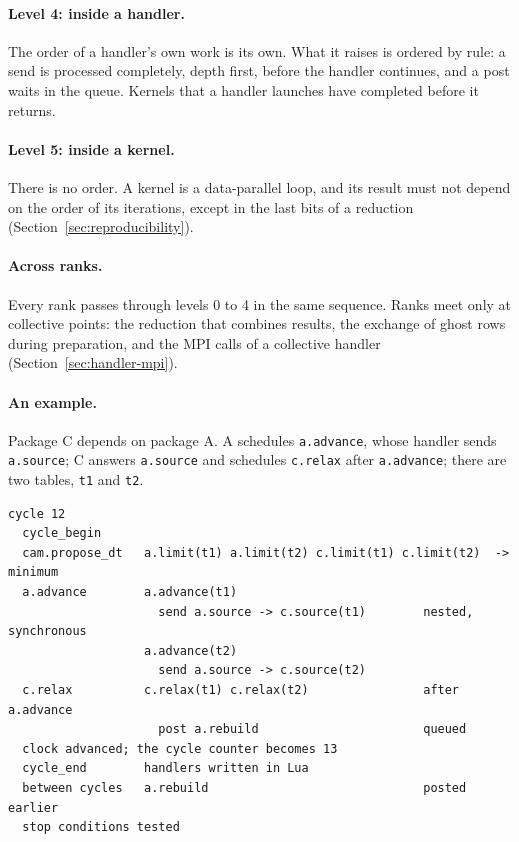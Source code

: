 \documentclass[11pt,a4paper]{article}
\newcommand{\code}[1]{\texttt{#1}}
\begin{document}
\paragraph{Level 4: inside a handler.}  The order of a handler's own work is
its own.  What it raises is ordered by rule: a send is processed completely,
depth first, before the handler continues, and a post waits in the queue.
Kernels that a handler launches have completed before it returns.

\paragraph{Level 5: inside a kernel.}  There is no order.  A kernel is a
data-parallel loop, and its result must not depend on the order of its
iterations, except in the last bits of a reduction
(Section~\ref{sec:reproducibility}).

\paragraph{Across ranks.}  Every rank passes through levels 0 to 4 in the
same sequence.  Ranks meet only at collective points: the reduction that
combines results, the exchange of ghost rows during preparation, and the
MPI calls of a collective handler (Section~\ref{sec:handler-mpi}).

\paragraph{An example.}  Package C depends on package A.  A schedules
\code{a.advance}, whose handler sends \code{a.source}; C answers
\code{a.source} and schedules \code{c.relax} after \code{a.advance}; there
are two tables, \code{t1} and \code{t2}.

\begin{lstlisting}
cycle 12
  cycle_begin
  cam.propose_dt   a.limit(t1) a.limit(t2) c.limit(t1) c.limit(t2)  -> minimum
  a.advance        a.advance(t1)
                     send a.source -> c.source(t1)        nested, synchronous
                   a.advance(t2)
                     send a.source -> c.source(t2)
  c.relax          c.relax(t1) c.relax(t2)                after a.advance
                     post a.rebuild                       queued
  clock advanced; the cycle counter becomes 13
  cycle_end        handlers written in Lua
  between cycles   a.rebuild                              posted earlier
  stop conditions tested
\end{lstlisting}
\end{document}
